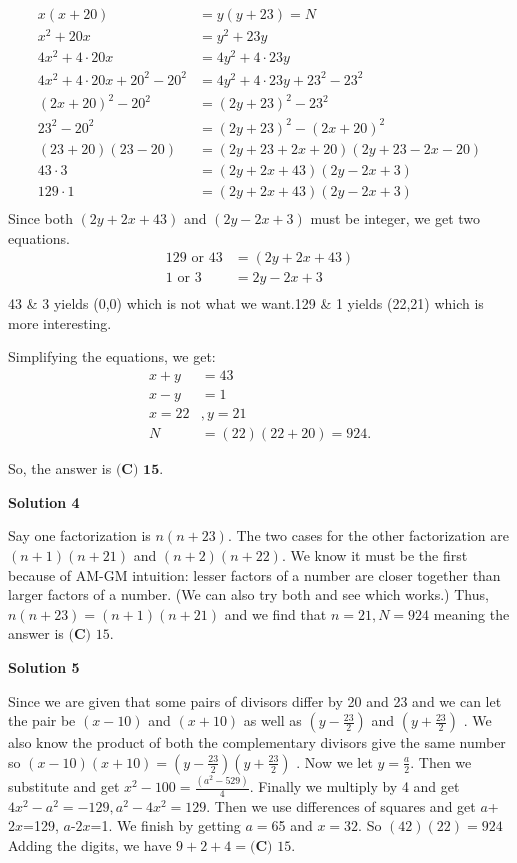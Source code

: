 \begin{enumerate}
 
 \begin{align*} x(x+20)&=y(y+23) = N\\ x^2+20x&=y^2+23y\\ 4x^2+4\cdot20x &= 4y^2+4\cdot23y\\ 4x^2+4\cdot20x+20^2-20^2 &= 4y^2+4\cdot23y+23^2-23^2\\ (2x+20)^2-20^2 &= (2y+23)^2-23^2\\ 23^2-20^2 &= (2y+23)^2-(2x+20)^2\\ (23+20)(23-20) &= (2y+23+2x+20)(2y+23-2x-20)\\ 43\cdot 3 &= (2y+2x+43)(2y-2x+3)\\ 129\cdot 1 &= (2y+2x+43)(2y-2x+3)\\ \end{align*}
Since both $(2y+2x+43)$ and $(2y-2x+3)$ must be integer, we get two equations.
 \begin{align} 129 \text{ or } 43 &= (2y+2x+43)\\ 1 \text{ or } 3 &= 2y-2x+3\\ \end{align}43 & 3 yields (0,0) which is not what we want.129 & 1 yields (22,21) which is more interesting.

 Simplifying the equations, we get:
 \begin{align*} x+y &= 43\\ x-y &= 1\\ x=22&, y=21\\ N &= (22)(22+20) = 924. \end{align*}


 So, the answer is $\boxed{\textbf{(C) 15}}$.

 


 



\textbf{Solution 4}

Say one factorization is $n(n+23).$ The two cases for the other factorization are $(n+1)(n+21)$ and $(n+2)(n+22).$ We know it must be the first because of AM-GM intuition: lesser factors of a number are closer together than larger factors of a number. (We can also try both and see which works.) Thus, $n(n+23)=(n+1)(n+21)$ and we find that $n=21,N=924$ meaning the answer is $\boxed{\textbf{(C) }15}.$




\textbf{Solution 5}

Since we are given that some pairs of divisors differ by 20 and 23 and we can let the pair be $(x-10)$ and $(x+10)$ as well as $(y-\frac{23}{2})$ and $(y+\frac{23}{2})$ . We also know the product of both the complementary divisors give the same number so $(x-10)(x+10)=(y-\frac{23}{2})(y+\frac{23}{2})$ . Now we let $y=\frac{a}{2}$. Then we substitute and get $x^2-100=\frac{(a^2-529)}{4}$. Finally we multiply by 4 and get $4x^2-a^2=-129, a^2-4x^2=129$. Then we use differences of squares and get $a$+$2x$=129, $a$-$2x$=1. We finish by getting $a=$65 and $x=32$. So $(42)(22) = 924$ Adding the digits, we have $9+2+4 = \boxed{\textbf{(C) } 15}$.


\end{enumerate}
